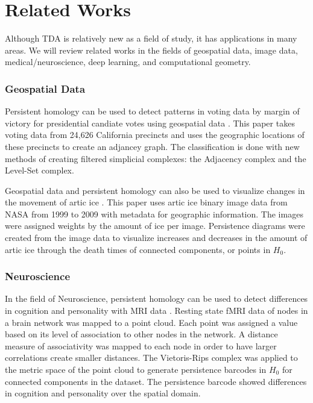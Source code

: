 \documentclass[ma]{uncgdissertationexp}
\theoremstyle{plain}
\theoremstyle{definition}
\theoremstyle{remark}
\begin{document}
\section{Related Works}
\par Although TDA is relatively new as a field of study, it has applications in many areas. We will review related works in the fields of geospatial data, image data, medical/neuroscience, deep learning, and computational geometry.
\subsubsection{Geospatial Data}
\par Persistent homology can be used to detect patterns in voting data by margin of victory for presidential candiate votes using geospatial data \cite{geospatial_voting}. This paper takes voting data from 24,626 California precincts and uses the geographic locations of these precincts to create an adjancey graph. The classification is done with new methods of creating filtered simplicial complexes: the Adjacency complex and the Level-Set complex.
\par Geospatial data and persistent homology can also be used to visualize changes in the movement of artic ice \cite{jocelyn_thesis}. This paper uses artic ice binary image data from NASA from 1999 to 2009 with metadata for geographic information. The images were assigned weights by the amount of ice per image. Persistence diagrams were created from the image data to visualize increases and decreases in the amount of artic ice through the death times of connected components, or points in $H_{0}$.
\subsubsection{Neuroscience}
\par In the field of Neuroscience, persistent homology can be used to detect differences in cognition and personality with MRI data \cite{TDA_MRI}. Resting state fMRI data of nodes in a brain network was mapped to a point cloud. Each point was assigned a value based on its level of association to other nodes in the network. A distance measure of associativity was mapped to each node in order to have larger correlations create smaller distances. The Vietoris-Rips complex was applied to the metric space of the point cloud to generate persistence barcodes in $H_{0}$ for connected components in the dataset. The persistence barcode showed differences in cognition and personality over the spatial domain.
\end{document}
